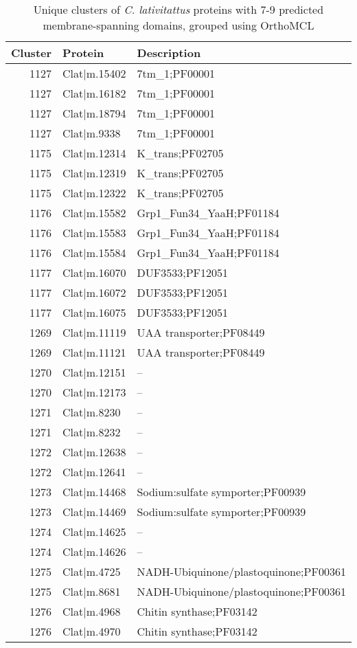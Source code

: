 \begin{table}[tbp]
\caption[orthoMCL clusters for transmembrane proteins]{Unique clusters of \textit{C. lativitattus} proteins with 7-9 predicted membrane-spanning domains, grouped using OrthoMCL} 
\label{tab:ChClat_orthomcl}
\begin{tabular}{rll}
 Cluster & Protein & Description \\ 
  \hline
1127 & Clat$|$m.15402 & 7tm\_1;PF00001 \\ 
   \hline
1127 & Clat$|$m.16182 & 7tm\_1;PF00001 \\ 
  1127 & Clat$|$m.18794 & 7tm\_1;PF00001 \\ 
  1127 & Clat$|$m.9338 & 7tm\_1;PF00001 \\ 
  1175 & Clat$|$m.12314 & K\_trans;PF02705 \\ 
  1175 & Clat$|$m.12319 & K\_trans;PF02705 \\ 
  1175 & Clat$|$m.12322 & K\_trans;PF02705 \\ 
  1176 & Clat$|$m.15582 & Grp1\_Fun34\_YaaH;PF01184 \\ 
  1176 & Clat$|$m.15583 & Grp1\_Fun34\_YaaH;PF01184 \\ 
  1176 & Clat$|$m.15584 & Grp1\_Fun34\_YaaH;PF01184 \\ 
  1177 & Clat$|$m.16070 & DUF3533;PF12051 \\ 
  1177 & Clat$|$m.16072 & DUF3533;PF12051 \\ 
  1177 & Clat$|$m.16075 & DUF3533;PF12051 \\ 
  1269 & Clat$|$m.11119 & UAA transporter;PF08449 \\ 
  1269 & Clat$|$m.11121 & UAA transporter;PF08449 \\ 
  1270 & Clat$|$m.12151 & -- \\ 
  1270 & Clat$|$m.12173 & -- \\ 
  1271 & Clat$|$m.8230 & -- \\ 
  1271 & Clat$|$m.8232 & -- \\ 
  1272 & Clat$|$m.12638 & -- \\ 
  1272 & Clat$|$m.12641 & -- \\ 
  1273 & Clat$|$m.14468 & Sodium:sulfate symporter;PF00939 \\ 
  1273 & Clat$|$m.14469 & Sodium:sulfate symporter;PF00939 \\ 
  1274 & Clat$|$m.14625 & -- \\ 
  1274 & Clat$|$m.14626 & -- \\ 
  1275 & Clat$|$m.4725 & NADH-Ubiquinone/plastoquinone;PF00361 \\ 
  1275 & Clat$|$m.8681 & NADH-Ubiquinone/plastoquinone;PF00361 \\ 
  1276 & Clat$|$m.4968 & Chitin synthase;PF03142 \\ 
  1276 & Clat$|$m.4970 & Chitin synthase;PF03142 \\ 
   \hline
\end{tabular}
\end{table}

